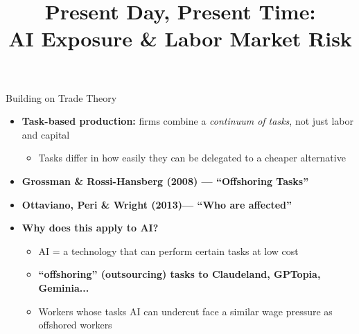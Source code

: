 \documentclass[aspectratio=169]{beamer}
\title[AI \& Labor Market Risk]{Present Day, Present Time:\\
  AI Exposure \& Labor Market Risk}
\begin{document}
\begin{frame}
\titlepage
\end{frame}

\begin{frame}{Building on Trade Theory}

\begin{itemize}
  \item \textbf{Task-based production:} firms combine a \emph{continuum of tasks}, not just labor and capital
  \begin{itemize}
    \item Tasks differ in how easily they can be delegated to a cheaper alternative
  \end{itemize}

  \bigskip
  \item \textbf{Grossman \& Rossi-Hansberg (2008) --- ``Offshoring Tasks''}
  
  \bigskip
  \item \textbf{Ottaviano, Peri \& Wright (2013)--- ``Who are affected''}


  \bigskip
  \item \textbf{Why does this apply to AI?}
  \begin{itemize}
    \item AI = a technology that can perform certain tasks at low cost
    \item \textbf{``offshoring'' (outsourcing) tasks
    to Claudeland, GPTopia, Geminia...}
    \item Workers whose tasks AI can undercut face a similar wage pressure as offshored workers
  \end{itemize}
\end{itemize}

\end{frame}
\end{document}
